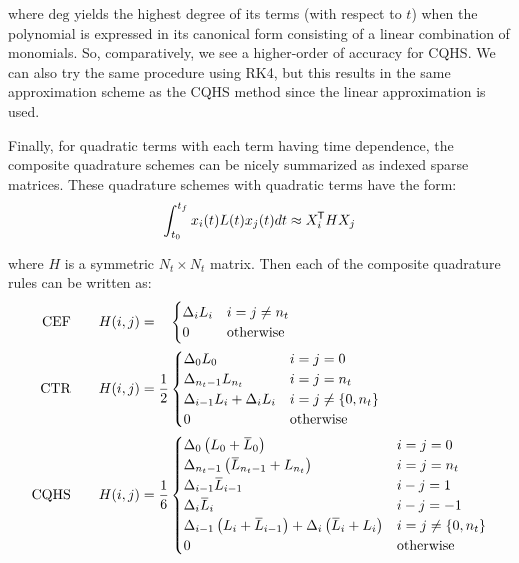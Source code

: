 \noindent where $\mathrm{deg}$ yields the highest degree of its terms (with respect to $t$) when the polynomial is expressed in its canonical form consisting of a linear combination of monomials.
So, comparatively, we see a higher-order of accuracy for CQHS. We can also try the same procedure using RK4, but this results in the same approximation scheme as the CQHS method since the linear approximation is used.

Finally, for quadratic terms with each term having time dependence, the composite quadrature schemes can be nicely summarized as indexed sparse matrices. These quadrature schemes with quadratic terms have the form:  
\begin{align}
\int_{t_0}^{t_f} x_i(t) L(t) x_j(t) dt\approx X_i^{\mkern-1.5mu\mathsf{T}} H X_j
\end{align}

\noindent where ${H}$ is a symmetric $N_t \times N_t$ matrix. Then each of the composite quadrature rules can be written as:%
\allowdisplaybreaks[1]%
\begin{subequations}%
\begin{align}
\text{CEF}& \qquad  {H}(i,j) = \phantom{\frac{1}{2}} \begin{cases} \Delta_i L_{i}  & i = j \neq n_t \\
0 & \text{otherwise}
\end{cases} \\
% 
\text{CTR}& \qquad {H}(i,j)  = \frac{1}{2} \begin{cases} \Delta_0 L_0  & i = j = 0 \\
\Delta_{n_t-1} L_{n_t} & i = j = n_t \\
\Delta_{i-1} L_{i} + \Delta_{i} L_{i} & i = j \neq \{0, n_t \}  \\
0 & \text{otherwise}
\end{cases} \label{eq:ch5:CTR} \\
% 
\text{CQHS}& \qquad {H}(i,j) = \frac{1}{6} \begin{cases} \Delta_0 \left( L_0 + \myoverbar{L}_0 \right) & i = j = 0 \\
\Delta_{n_t-1} \left( \myoverbar{L}_{n_t-1} + L_{n_t}  \right) & i = j = n_t \\
\Delta_{i-1} \myoverbar{L}_{i-1} & i - j = 1 \\ %
\Delta_{i} \myoverbar{L}_{i} & i - j = -1 \\ %
\Delta_{i-1} \left( L_{i} + \myoverbar{L}_{i-1} \right) + \Delta_{i} \left( \myoverbar{L}_{i} + L_{i} \right) & i = j \neq \{0, n_t \} \\
0 & \text{otherwise}
\end{cases}
\end{align}
\end{subequations}%
\allowdisplaybreaks[0]%

